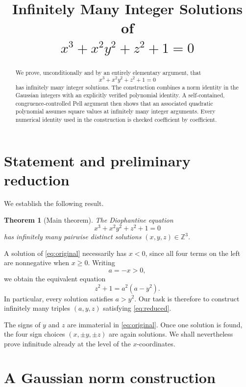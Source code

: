 \documentclass[11pt]{article}
\title{Infinitely Many Integer Solutions of\\[0.25em]
\texorpdfstring{$x^3+x^2y^2+z^2+1=0$}{x^3 + x^2 y^2 + z^2 + 1 = 0}}
\author{}
\date{}
\newtheorem{theorem}{Theorem}[section]
\theoremstyle{remark}
\newcommand{\Z}{\mathbb Z}
\begin{document}
\maketitle
\vspace{-2.5em}

\begin{abstract}
We prove, unconditionally and by an entirely elementary argument, that
\[
 x^3+x^2y^2+z^2+1=0
\]
has infinitely many integer solutions.  The construction combines a norm identity in the Gaussian integers with an explicitly verified polynomial identity.  A self-contained, congruence-controlled Pell argument then shows that an associated quadratic polynomial assumes square values at infinitely many integer arguments.  Every numerical identity used in the construction is checked coefficient by coefficient.
\end{abstract}

\section{Statement and preliminary reduction}

We establish the following result.

\begin{theorem}[Main theorem]\label{thm:main}
The Diophantine equation
\begin{equation}\label{eq:original}
 x^3+x^2y^2+z^2+1=0
\end{equation}
has infinitely many pairwise distinct solutions $(x,y,z)\in\Z^3$.
\end{theorem}

A solution of \eqref{eq:original} necessarily has $x<0$, since all four terms on the left are nonnegative when $x\ge 0$.  Writing
\[
 a=-x>0,
\]
we obtain the equivalent equation
\begin{equation}\label{eq:reduced}
 z^2+1=a^2(a-y^2).
\end{equation}
In particular, every solution satisfies $a>y^2$.  Our task is therefore to construct infinitely many triples $(a,y,z)$ satisfying \eqref{eq:reduced}.

The signs of $y$ and $z$ are immaterial in \eqref{eq:original}.  Once one solution is found, the four sign choices $(x,\pm y,\pm z)$ are again solutions.  We shall nevertheless prove infinitude already at the level of the $x$-coordinates.

\section{A Gaussian norm construction}
\end{document}

